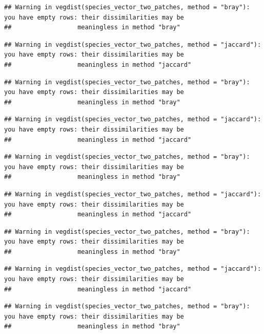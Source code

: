 \documentclass[
]{article}
\begin{document}
\begin{verbatim}
## Warning in vegdist(species_vector_two_patches, method = "bray"): you have empty rows: their dissimilarities may be
##                  meaningless in method "bray"
\end{verbatim}

\begin{verbatim}
## Warning in vegdist(species_vector_two_patches, method = "jaccard"): you have empty rows: their dissimilarities may be
##                  meaningless in method "jaccard"
\end{verbatim}

\begin{verbatim}
## Warning in vegdist(species_vector_two_patches, method = "bray"): you have empty rows: their dissimilarities may be
##                  meaningless in method "bray"
\end{verbatim}

\begin{verbatim}
## Warning in vegdist(species_vector_two_patches, method = "jaccard"): you have empty rows: their dissimilarities may be
##                  meaningless in method "jaccard"
\end{verbatim}

\begin{verbatim}
## Warning in vegdist(species_vector_two_patches, method = "bray"): you have empty rows: their dissimilarities may be
##                  meaningless in method "bray"
\end{verbatim}

\begin{verbatim}
## Warning in vegdist(species_vector_two_patches, method = "jaccard"): you have empty rows: their dissimilarities may be
##                  meaningless in method "jaccard"
\end{verbatim}

\begin{verbatim}
## Warning in vegdist(species_vector_two_patches, method = "bray"): you have empty rows: their dissimilarities may be
##                  meaningless in method "bray"
\end{verbatim}

\begin{verbatim}
## Warning in vegdist(species_vector_two_patches, method = "jaccard"): you have empty rows: their dissimilarities may be
##                  meaningless in method "jaccard"
\end{verbatim}

\begin{verbatim}
## Warning in vegdist(species_vector_two_patches, method = "bray"): you have empty rows: their dissimilarities may be
##                  meaningless in method "bray"
\end{verbatim}
\end{document}
